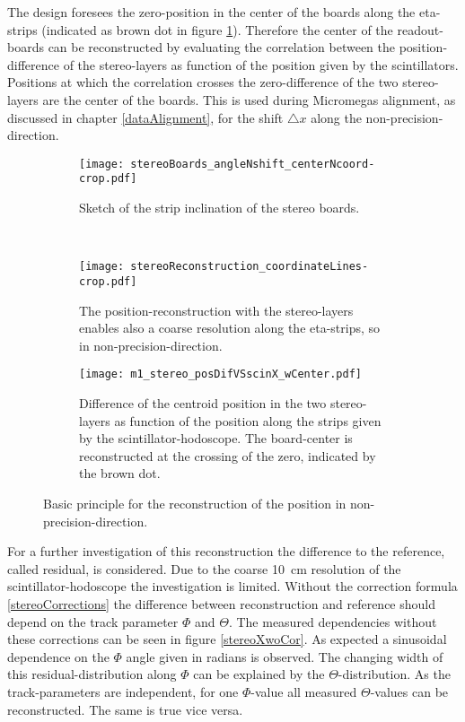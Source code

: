 \documentclass[
twoside,            %
BCOR1.4cm,          %
10pt,               %
headings=normal,    %
headsepline,        %
clearplainpage,		%
final,              %
div=14,
open=right,
bibliography=toc
]{scrreprt}
\begin{document}
The design foresees the zero-position in the center of the boards along the eta-strips (indicated as brown dot in figure \ref{stereoStripsSketch}).
Therefore the center of the readout-boards can be reconstructed by evaluating the correlation between the position-difference of the  stereo-layers as function of the position given by the scintillators.
Positions at which the correlation crosses the zero-difference of the two stereo-layers are the center of the boards.
This is used during Micromegas alignment, as discussed in chapter \ref{dataAlignment}, for the shift $\bigtriangleup x$ along the non-precision-direction.

\begin{figure}[!h]
	\begin{subfigure}[b]{0.48\textwidth}
		\centering
		\texttt{[image: stereoBoards\_angleNshift\_centerNcoord-crop.pdf]}
		\caption{Sketch of the strip inclination of the stereo boards.}
		\label{stereoStripsSketch} 
	\end{subfigure}
	\vspace{-30mm}
	\\
	\begin{subfigure}[b]{0.48\textwidth}
		\centering
		\texttt{[image: stereoReconstruction\_coordinateLines-crop.pdf]}
		\caption{
			The position-reconstruction with the stereo-layers enables also a coarse resolution along the eta-strips, so in non-precision-direction.
		}
		\label{stereoStripCombination} 
	\end{subfigure}
	\hfill
	\begin{subfigure}[b]{0.48\textwidth}
		\centering
		\texttt{[image: m1\_stereo\_posDifVSscinX\_wCenter.pdf]}
		\caption{
			Difference of the centroid position in the two stereo-layers as function of the position along the strips given by the scintillator-hodoscope.
			The board-center is reconstructed at the crossing of the zero, indicated by the brown dot.
		}
		\label{stereoScinCorrelation} 
	\end{subfigure}
	\vspace{-2mm}
	\caption{
		Basic principle for the reconstruction of the position in non-precision-direction.
	}
\end{figure}

For a further investigation of this reconstruction the difference to the reference, called residual, is considered.
Due to the coarse \SI{10}{cm} resolution of the scintillator-hodoscope the investigation is limited.
Without the correction formula \ref{stereoCorrections} the difference between reconstruction and reference should depend on the track parameter $\Phi$ and $\Theta$.
The measured dependencies without these corrections can be seen in figure \ref{stereoXwoCor}.
As expected a sinusoidal dependence on the $\Phi$ angle given in radians is observed.
The changing width of this residual-distribution along $\Phi$ can be explained by the $\Theta$-distribution.
As the track-parameters are independent, for one $\Phi$-value all measured $\Theta$-values can be reconstructed.
The same is true vice versa.
\end{document}
